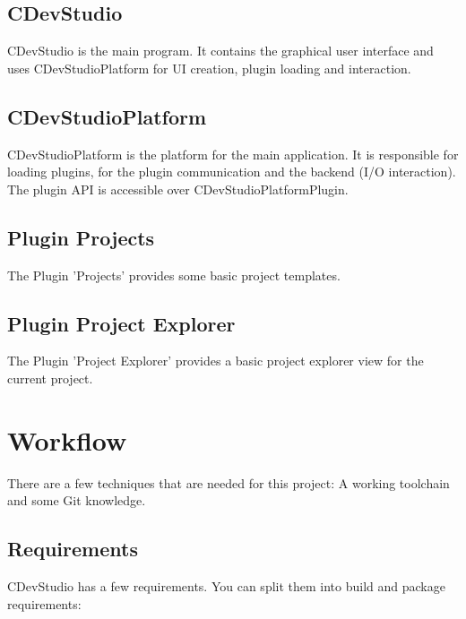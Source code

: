 \documentclass{article}
\begin{document}
\subsection{CDevStudio}
CDevStudio is the main program. It contains the graphical user interface and uses CDevStudioPlatform for UI creation, plugin loading and interaction.

\subsection{CDevStudioPlatform}
CDevStudioPlatform is the platform for the main application. It is responsible for loading plugins, for the plugin communication and the backend (I/O interaction). The plugin API is accessible over CDevStudioPlatformPlugin.

\subsection{Plugin Projects}
The Plugin 'Projects' provides some basic project templates.

\subsection{Plugin Project Explorer}
The Plugin 'Project Explorer' provides a basic project explorer view for the current project.

\section{Workflow}
There are a few techniques that are needed for this project: A working toolchain and some Git knowledge.

\subsection{Requirements}
CDevStudio has a few requirements. You can split them into build and package requirements:
\end{document}
